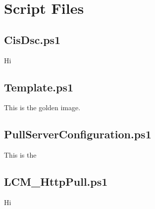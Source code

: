 \chapter{Script Files}
\label{overview}

  \section{CisDsc.ps1}
    Hi

  \section{Template.ps1}
    This is the golden image.

  \section{PullServerConfiguration.ps1}
    This is the 

  \section{LCM\_HttpPull.ps1}
    Hi